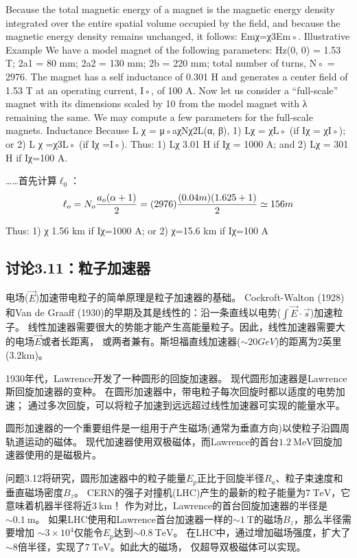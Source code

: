 Because the total magnetic energy of a magnet is the magnetic energy density
integrated over the entire spatial volume occupied by the field, and because the
magnetic energy density remains unchanged, it follows: Emχ=χ3Em◦.
Illustrative Example
We have a model magnet of the following parameters: Hz(0, 0) = 1.53 T; 2a1 =
80 mm; 2a2 = 130 mm; 2b = 220 mm; total number of turns, N◦ = 2976. The
magnet has a self inductance of 0.301 H and generates a center field of 1.53 T at
an operating current, I◦, of 100 A. Now let us consider a “full-scale” magnet with
its dimensions scaled by 10 from the model magnet with λ remaining the same.
We may compute a few parameters for the full-scale magnets.
Inductance Because L
χ = μ◦aχNχ2L(α, β), 1) Lχ = χL◦ (if Iχ = χI◦); or 2)
L
χ =χ3L◦ (if Iχ =I◦). Thus: 1) Lχ 3.01 H if Iχ = 1000 A; and 2) Lχ = 301 H if
Iχ=100 A.

……首先计算$\ell_0$：
$$
\ell_{o}=N_{o}\frac{a_{o}(\alpha+1)}{2}\\
=(2976)\frac{(0.04m)(1.625+1)}{2}\simeq156m\\
$$

Thus: 1) χ 1.56 km if Iχ=1000 A; or 2) χ=15.6 km if Iχ=100 A
\newpage


\subsection{讨论3.11：粒子加速器}
电场($\vec{E}$)加速带电粒子的简单原理是粒子加速器的基础。
Cockroft-Walton (1928)和Van de Graaff (1930)的早期及其是线性的：沿一条直线以电势($\int\vec{E}\cdot\vec{s}$)加速粒子。
线性加速器需要很大的势能才能产生高能量粒子。因此，线性加速器需要大的电场$\vec{E}$或者长距离，
或两者兼有。斯坦福直线加速器($\sim 20 GeV$)的距离为2英里(3.2km)。

1930年代，Lawrence开发了一种圆形的回旋加速器。
现代圆形加速器是Lawrence斯回旋加速器的变种。
在圆形加速器中，带电粒子每次回旋时都以适度的电势加速；
通过多次回旋，可以将粒子加速到远远超过线性加速器可实现的能量水平。

圆形加速器的一个重要组件是一组用于产生磁场(通常为垂直方向)以使粒子沿圆周轨道运动的磁体。
现代加速器使用双极磁体，而Lawrence的首台$1.2\ \mathrm{MeV}$回旋加速器使用的是磁极片。

问题3.12将研究，圆形加速器中的粒子能量$E_p$正比于回旋半径$R_a$、粒子束速度和垂直磁场密度$B_z$。
CERN的强子对撞机(LHC)产生的最新的粒子能量为$7\ \mathrm{TeV}$，它意味着机器半径将近$3\ \mathrm{km}$！
作为对比，Lawrence的首台回旋加速器的半径是$\sim 0.1\ \mathrm{m}$。
如果LHC使用和Lawrence首台加速器一样的$\sim 1\ \mathrm{T}$的磁场$B_z$，那么半径需要增加
$\sim 3\times 10^4$仅能令$E_p$达到$\sim 0.8\ \mathrm{TeV}$。
在LHC中，通过增加磁场强度，扩大了$\sim 8$倍半径，实现了$7\ \mathrm{TeV}$。如此大的磁场，
仅超导双极磁体可以实现。
\newpage


